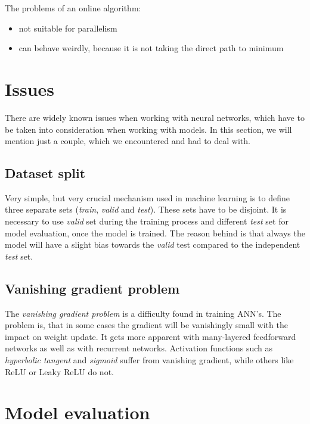 \noindent
The problems of an online algorithm:

\begin{itemize}

\item not suitable for parallelism
\item can behave weirdly, because it is not taking the direct path to minimum

\end{itemize}

\section{Issues}

There are widely known issues when working with neural networks, which have to be taken into consideration when working with models. In this section, we will mention just a couple, which we encountered and had to deal with.

\subsection{Dataset split}

Very simple, but very crucial mechanism used in machine learning is to define three separate sets (\textit{train}, \textit{valid} and \textit{test}). These sets have to be disjoint. It is necessary to use \textit{valid} set during the training process and different \textit{test} set for model evaluation, once the model is trained. The reason behind is that always the model will have a slight bias towards the \textit{valid} test compared to the independent \textit{test} set.

\subsection{Vanishing gradient problem}

\label{vanishing_gradient}

The \textit{vanishing gradient problem}\cite{vanishing_gradient} is a difficulty found in training ANN's. The problem is, that in some cases the gradient will be vanishingly small with the impact on weight update. It gets more apparent with many-layered feedforward networks as well as with recurrent networks. Activation functions such as \textit{hyperbolic tangent} and \textit{sigmoid} suffer from vanishing gradient, while others like ReLU or Leaky ReLU do not.

\section{Model evaluation}
\label{nn-metrics}


